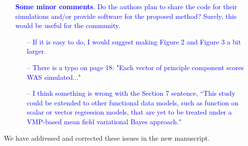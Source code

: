 \documentclass[12pt]{article}
\theoremstyle{plain}
\theoremstyle{definition}
\theoremstyle{remark}
\begin{document}
\begin{itemize}
	\item[\textcolor{blue}{\textbullet}] \textcolor{blue}{
		\textbf{Some minor comments}. Do the authors plan to share the code for their simulations and/or provide software for
		the proposed method? Surely, this would be useful for the community.
	}
	\begin{itemize}
		\item [\textcolor{blue}{--}] \textcolor{blue}{
			If it is easy to do, I would suggest making Figure 2 and Figure 3 a bit larger.
		}
		\item [\textcolor{blue}{--}] \textcolor{blue}{
			There is a typo on page 18: "Each vector of principle component scores WAS simulated..."
		}
		\item [\textcolor{blue}{--}] \textcolor{blue}{
			I think something is wrong with the Section 7 sentence, “This study could be extended to other functional data
			models, such as function on scalar or vector regression models, that are yet to be treated under a VMP-based
			mean field variational Bayes approach."
		}
	\end{itemize}
\end{itemize}

\vspace{1\baselineskip}

We have addressed and corrected these issues in the new manuscript.






\end{document}
